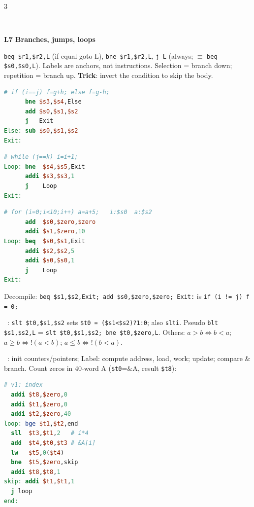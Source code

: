 \documentclass[landscape]{article}
\newcommand{\sect}[1]{\par\vspace{2pt}\noindent{\color{cur}\rule[-1.5pt]{\linewidth}{0.4pt}}\\[-7.5pt]%
  \noindent\colorbox{cur!12}{\parbox{\dimexpr\linewidth-2\fboxsep}{\color{cur}\bfseries #1}}\par\vspace{0.5pt}}
\newcommand{\sub}[1]{\par\vspace{1pt}{\color{cur}\bfseries #1}\ }
\newcommand{\key}[1]{\textbf{\color{BrickRed}#1}}
\newcommand{\tc}[1]{\texttt{#1}}
\begin{document}
\begin{multicols*}{3}
\sect{L7 \; Branches, jumps, loops}
\tc{beq \$r1,\$r2,L} (if equal goto L), \tc{bne \$r1,\$r2,L}, \tc{j L} (always; $\equiv$ \tc{beq \$s0,\$s0,L}). Labels are anchors, not instructions. Selection = branch down; repetition = branch up.
\key{Trick}: invert the condition to skip the body.\\
\begin{minipage}[t]{0.49\linewidth}
\begin{lstlisting}[language=mips]
# if (i==j) f=g+h; else f=g-h;
      bne $s3,$s4,Else
      add $s0,$s1,$s2
      j   Exit
Else: sub $s0,$s1,$s2
Exit:
\end{lstlisting}
\end{minipage}\hfill
\begin{minipage}[t]{0.49\linewidth}
\begin{lstlisting}[language=mips]
# while (j==k) i=i+1;
Loop: bne  $s4,$s5,Exit
      addi $s3,$s3,1
      j    Loop
Exit:
\end{lstlisting}
\end{minipage}
\begin{lstlisting}[language=mips]
# for (i=0;i<10;i++) a=a+5;   i:$s0  a:$s2
      add  $s0,$zero,$zero
      addi $s1,$zero,10
Loop: beq  $s0,$s1,Exit
      addi $s2,$s2,5
      addi $s0,$s0,1
      j    Loop
Exit:
\end{lstlisting}
Decompile: \tc{beq \$s1,\$s2,Exit; add \$s0,\$zero,\$zero; Exit:} is \tc{if (i != j) f = 0;}\\
\sub{Inequalities}: \tc{slt \$t0,\$s1,\$s2} sets \tc{\$t0 = (\$s1<\$s2)?1:0}; also \tc{slti}. Pseudo \tc{blt \$s1,\$s2,L} = \tc{slt \$t0,\$s1,\$s2; bne \$t0,\$zero,L}. Others: $a>b\Leftrightarrow b<a$; $a\ge b\Leftrightarrow !(a<b)$; $a\le b\Leftrightarrow !(b<a)$.\\
\sub{Array + loop}: init counters/pointers; Label: compute address, load, work; update; compare \& branch. Count zeros in 40-word A (\tc{\$t0}=\&A, result \tc{\$t8}):
\begin{minipage}[t]{0.5\linewidth}
\begin{lstlisting}[language=mips]
# v1: index
  addi $t8,$zero,0
  addi $t1,$zero,0
  addi $t2,$zero,40
loop: bge $t1,$t2,end
  sll  $t3,$t1,2   # i*4
  add  $t4,$t0,$t3 # &A[i]
  lw   $t5,0($t4)
  bne  $t5,$zero,skip
  addi $t8,$t8,1
skip: addi $t1,$t1,1
  j loop
end:
\end{lstlisting}
\end{minipage}\hfill
\begin{minipage}[t]{0.48\linewidth}
\begin{lstlisting}[language=mips]

\end{lstlisting}
\end{minipage}
\end{multicols*}
\end{document}
